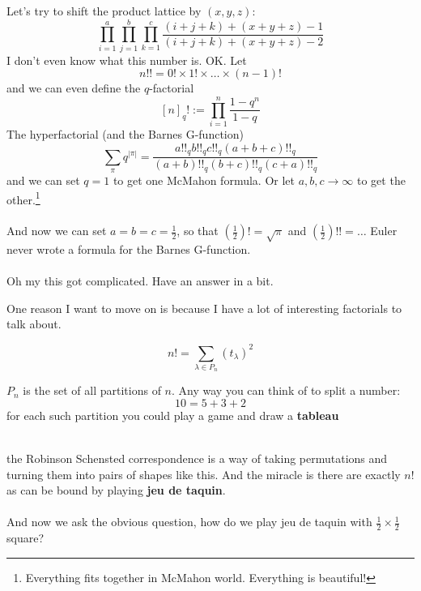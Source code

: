 \documentclass[12pt]{article}
\newcommand{\sq}[3]{
\node at (#1+0.5,#2+0.5) {#3};
\draw (#1+0,#2+0)--(#1+1,#2+0)--(#1+1,#2+1)--(#1+0,#2+1)--cycle;
}
\begin{document}
\noindent Let's try to shift the product lattice by $(x,y,z)$:
$$  
\prod_{i=1}^a 
\prod_{j=1}^b
\prod_{k=1}^c \frac{(i+j+k)+(x+y+z)-1}{(i+j+k)+(x+y+z)-2} $$
I don't even know what this number is.  OK.  Let
$$ n!! = 0! \times 1! \times \dots \times (n-1)! $$
and we can even define the $q$-factorial 
$$[n]_q! := \prod_{i=1}^n \frac{1 -q^n}{1-q} $$
The hyperfactorial (and the Barnes G-function)
$$ \sum_\pi q^{|\pi|} = \frac{a!!_q b!!_q c!!_q (a+b+c)!!_q}{(a+b)!!_q (b+c)!!_q (c+a)!!_q} $$
and we can set $q=1$ to get one McMahon formula.  Or let $a,b,c \to \infty$ to get the other.\footnote{Everything fits together in McMahon world.  Everything is beautiful!} \\ \\
And now we can set $a = b = c = \frac{1}{2}$, so that $(\frac{1}{2})! = \sqrt{\pi}$ and $(\frac{1}{2})!! = \dots $ Euler never wrote a formula for the Barnes G-function. \\ \\
Oh my this got complicated.  Have an answer in a bit.
\newpage

\noindent One reason I want to move on is because 
I have a lot of interesting factorials to talk about.

$$ n! = \sum_{\lambda \in P_n} (t_\lambda)^2 $$

$P_n$ is the set of all partitions of $n$.  Any way you can think of to split a number:
$$ 10 = 5 + 3 + 2$$
for each such partition you could play a game and draw a \textbf{tableau} \\\\
the Robinson Schensted correspondence is a way of taking permutations and turning them into pairs of shapes like this.  And the miracle is there are exactly $n!$ as can be bound by playing \textbf{jeu de taquin}. \\ \\
And now we ask the obvious question, how do we play jeu de taquin with $\frac{1}{2} \times \frac{1}{2}$ square?
\end{document}
